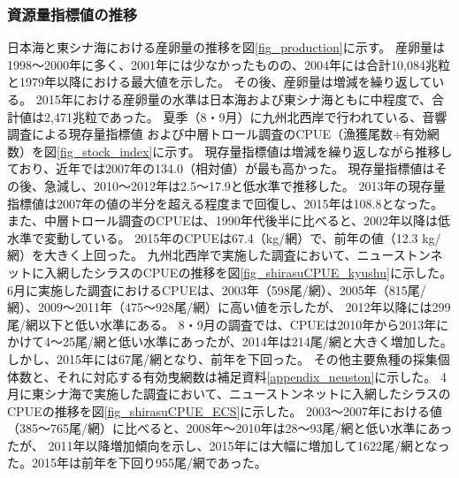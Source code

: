 \subsubsection{資源量指標値の推移}
日本海と東シナ海における産卵量の推移を図\ref{fig_production}に示す。
産卵量は1998～2000年に多く、2001年には少なかったものの、2004年には合計10,084兆粒と1979年以降における最大値を示した。
その後、産卵量は増減を繰り返している。
2015年における産卵量の水準は日本海および東シナ海ともに中程度で、合計値は2,471兆粒であった。
%
%
夏季（8・9月）に九州北西岸で行われている、音響調査による現存量指標値\citep{Ohshimo2004}
および中層トロール調査のCPUE（漁獲尾数÷有効網数）を図\ref{fig_stock_index}に示す。
現存量指標値は増減を繰り返しながら推移しており、近年では2007年の134.0（相対値）が最も高かった。
現存量指標値はその後、急減し、2010～2012年は2.5～17.9と低水準で推移した。
2013年の現存量指標値は2007年の値の半分を超える程度まで回復し、2015年は108.8となった。
また、中層トロール調査のCPUEは、1990年代後半に比べると、2002年以降は低水準で変動している。
2015年のCPUEは67.4（kg/網）で、前年の値（12.3 kg/網）を大きく上回った。
%
%
九州北西岸で実施した調査において、ニューストンネットに入網したシラスのCPUEの推移を図\ref{fig_shirasuCPUE_kyushu}に示した。
6月に実施した調査におけるCPUEは、2003年（598尾/網）、2005年（815尾/網）、2009～2011年（475～928尾/網）に高い値を示したが、
2012年以降には299尾/網以下と低い水準にある。
%
8・9月の調査では、CPUEは2010年から2013年にかけて4～25尾/網と低い水準にあったが、2014年は214尾/網と大きく増加した。
しかし、2015年には67尾/網となり、前年を下回った。
その他主要魚種の採集個体数と、それに対応する有効曳網数は補足資料\ref{appendix_neuston}に示した。
4月に東シナ海で実施した調査において、ニューストンネットに入網したシラスのCPUEの推移を図\ref{fig_shirasuCPUE_ECS}に示した。
2003～2007年における値（385～765尾/網）に比べると、2008年～2010年は28～93尾/網と低い水準にあったが、
2011年以降増加傾向を示し、2015年には大幅に増加して1622尾/網となった。2015年は前年を下回り955尾/網であった。
